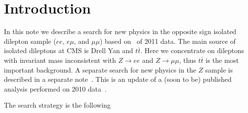 \section{Introduction}
\label{sec:intro}

In this note we describe a search for new physics in the
opposite sign isolated dilepton sample ($ee$, $e\mu$, and $\mu\mu$)
based on \lumi\ of 2011 data.
The main source of 
isolated dileptons at CMS is Drell Yan and $t\bar{t}$.
Here we concentrate on dileptons with invariant mass inconsistent
with $Z \to ee$ and $Z \to \mu\mu$, thus $t\bar{t}$ is the most
important background.  A separate search for new physics in the $Z$ 
sample is described in a separate note~\cite{ref:Ztemplates}.
This is an update of a (soon to be) published analysis performed 
on 2010 data~\cite{ref:osnote,ref:ospaper}. 

The search strategy is the following

